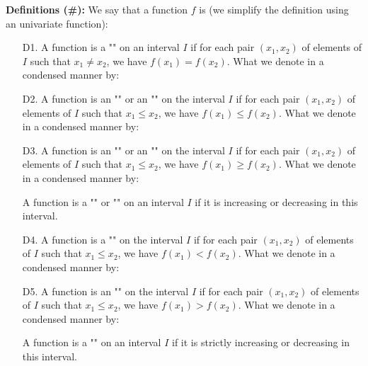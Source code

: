 	\textbf{Definitions (\#\mydef):} We say that a function $f$ is (we simplify the definition using an univariate function):
	\begin{itemize}
		\item[D1.] A function is a "" on an interval $I$ if for each pair $(x_1,x_2)$ of elements of $I$ such that $x_1\neq x_2$, we have $f(x_1)=f(x_2)$. What we denote in a condensed manner by:
		
		
		\item[D2.] A function is an "" or an "" on the interval $I$ if for each pair $(x_1,x_2)$ of elements of $I$ such that $x_1\leq x_2$, we have $f(x_1)\leq f(x_2)$. What we denote in a condensed manner by:
		
		
		\item[D3.] A function is an "" or an "" on the interval $I$ if for each pair $(x_1,x_2)$ of elements of $I$ such that $x_1\leq x_2$, we have $f(x_1)\geq f(x_2)$. What we denote in a condensed manner by:
		
		\begin{tcolorbox}[title=Remark,colframe=black,arc=10pt]
		A function is a "" or "" on an interval $I$ if it is increasing or decreasing in this interval.
		\end{tcolorbox}
		
		\item[D4.] A function is a ""  on the interval $I$ if for each pair $(x_1,x_2)$ of elements of $I$ such that $x_1\leq x_2$, we have $f(x_1)< f(x_2)$. What we denote in a condensed manner by:
		
		
		\item[D5.] A function is an ""  on the interval $I$ if for each pair $(x_1,x_2)$ of elements of $I$ such that $x_1\leq x_2$, we have $f(x_1)> f(x_2)$. What we denote in a condensed manner by:
		
		\begin{tcolorbox}[title=Remark,colframe=black,arc=10pt]
		A function is a "" on an interval $I$ if it is strictly increasing or decreasing in this interval.
		\end{tcolorbox}
	\end{itemize}
	
